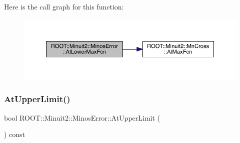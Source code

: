 Here is the call graph for this function\+:
\nopagebreak
\begin{figure}[H]
\begin{center}
\leavevmode
\includegraphics[width=350pt]{d2/dd1/classROOT_1_1Minuit2_1_1MinosError_a6ec22eac3b7dd1a281f1df710ed1dc74_cgraph}
\end{center}
\end{figure}
\mbox{\label{classROOT_1_1Minuit2_1_1MinosError_a6c8a60e5b855f9d7164f441ea69c75eb}} 
\subsubsection{\texorpdfstring{AtUpperLimit()}{AtUpperLimit()}\hspace{0.1cm}{\footnotesize\ttfamily [1/3]}}
{\footnotesize\ttfamily bool R\+O\+O\+T\+::\+Minuit2\+::\+Minos\+Error\+::\+At\+Upper\+Limit (\begin{DoxyParamCaption}{ }\end{DoxyParamCaption}) const\hspace{0.3cm}{\ttfamily [inline]}}

